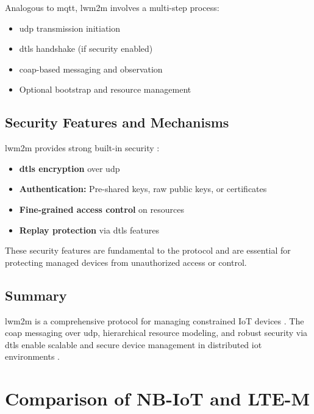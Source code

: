 \documentclass[12pt, english, openany]{book}
\begin{document}
Analogous to \gls{mqtt}, \gls{lwm2m} involves a multi-step process:

\begin{itemize}
    \item \gls{udp} transmission initiation
    \item \gls{dtls} handshake (if security enabled)
    \item \gls{coap}-based messaging and observation
    \item Optional bootstrap and resource management
\end{itemize}

\subsection{Security Features and Mechanisms}

\gls{lwm2m} provides strong built-in security \parencite{oma_lwm2m_2017}:

\begin{itemize}
    \item \textbf{\gls{dtls} encryption} over \gls{udp}
    \item \textbf{Authentication:} Pre-shared keys, raw public keys, or certificates
    \item \textbf{Fine-grained access control} on resources
    \item \textbf{Replay protection} via \gls{dtls} features
\end{itemize}

These security features are fundamental to the protocol and are essential for protecting managed devices from unauthorized access or control.

\subsection{Summary}

\gls{lwm2m} is a comprehensive protocol for managing constrained IoT devices \parencite{LWM2M_WIKI}. The \gls{coap} messaging over \gls{udp}, hierarchical resource modeling, and robust security via \gls{dtls} enable scalable and secure device management in distributed \gls{iot} environments \parencite{oma_lwm2m_2017}.

\section{Comparison of NB-IoT and LTE-M} \label{sec:comparison_nbiot_ltem}
\end{document}
